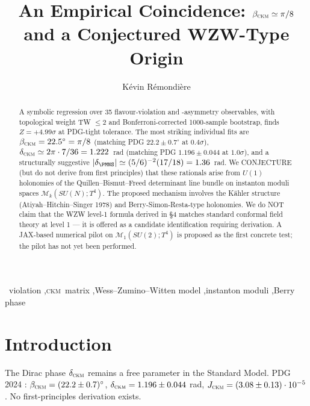 \documentclass[5p,times,twocolumn]{elsarticle}
\newcommand{\CP}{\mathit{CP}}
\newcommand{\CKM}{\textsc{ckm}}
\begin{document}
\begin{frontmatter}

\title{An Empirical Coincidence: $\beta_{\CKM} \simeq \pi/8$\\and a Conjectured WZW-Type Origin}

\author{K\'evin R\'emondi\`ere}
\address{Independent researcher, 64400 Oloron-Sainte-Marie, France}

\begin{abstract}
A symbolic regression over 35 flavour-violation and \CP-asymmetry observables, with topological weight TW $\leq 2$ and Bonferroni-corrected 1000-sample bootstrap, finds $Z = +4.99\sigma$ at PDG-tight tolerance. The most striking individual fits are $\beta_{\CKM} = 22.5^{\circ} = \pi/8$ (matching PDG $22.2 \pm 0.7^{\circ}$ at $0.4\sigma$), $\delta_{\CKM} \simeq 2\pi \cdot 7/36 = 1.222$~rad (matching PDG $1.196 \pm 0.044$ at $1.0\sigma$), and a structurally suggestive $|\delta_{\PMNS}| \simeq (5/6)^{-2}(17/18) = 1.36$~rad. We CONJECTURE (but do not derive from first principles) that these rationals arise from $U(1)$ holonomies of the Quillen--Bismut--Freed determinant line bundle on instanton moduli spaces $\mathcal{M}_{k}(SU(N); T^{4})$. The proposed mechanism involves the Kähler structure (Atiyah--Hitchin--Singer 1978) and Berry-Simon-Resta-type holonomies. We do NOT claim that the WZW level-1 formula derived in §4 matches standard conformal field theory at level 1 — it is offered as a candidate identification requiring derivation. A JAX-based numerical pilot on $\mathcal{M}_{1}(SU(2); T^{4})$ is proposed as the first concrete test; the pilot has not yet been performed.
\end{abstract}

\begin{keyword}
\CP\ violation \sep \CKM\ matrix \sep Wess--Zumino--Witten model \sep instanton moduli \sep Berry phase
\end{keyword}

\end{frontmatter}

\section{Introduction}
The Dirac phase $\delta_{\CKM}$ remains a free parameter in the Standard Model. PDG 2024 \cite{PDG2024}: $\beta_{\CKM} = (22.2 \pm 0.7)^{\circ}$, $\delta_{\CKM} = 1.196 \pm 0.044$ rad, $J_{\CKM} = (3.08 \pm 0.13) \cdot 10^{-5}$. No first-principles derivation exists.
\end{document}
